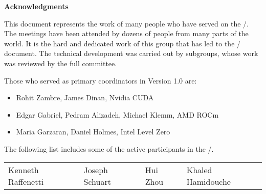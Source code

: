 {\Huge\noindent\textbf{Acknowledgments}}%
{}

\vspace{0.5in}



This document represents the work of many people who have served on
the \MPIHACC/.  The meetings have been attended by dozens of people
from many parts of the world. It is the hard and dedicated work of
this group that has led to the \MEMALLOCDOC/ document. The technical
development was carried out by subgroups, whose work was reviewed by
the full committee.

Those who served as primary coordinators in Version 1.0 are:

\begin{itemize}
\item Rohit Zambre, James Dinan, Nvidia CUDA
\item Edgar Gabriel, Pedram Alizadeh, Michael Klemm, AMD ROCm
\item Maria Garzaran, Daniel Holmes, Intel Level Zero
\end{itemize}

The following list includes some of the active participants in
the \MPIHACC/.

\begin{center}
\begin{tabular}{llll}
Kenneth Raffenetti     &
Joseph Schuart	&
Hui Zhou &
Khaled Hamidouche
\end{tabular}
\end{center}

